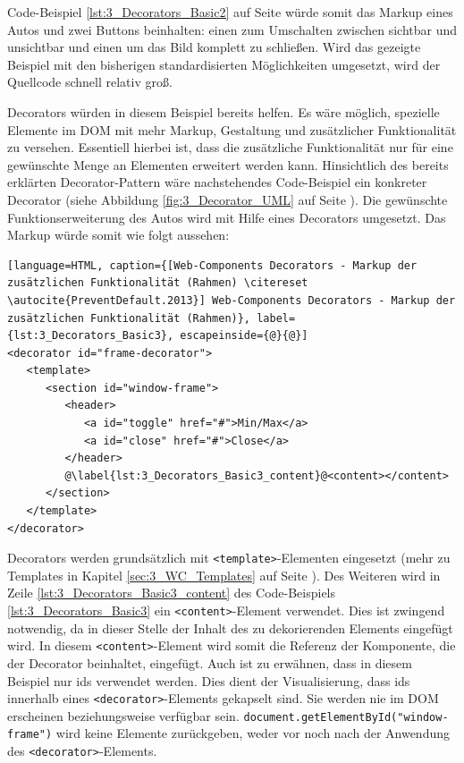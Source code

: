 Code-Beispiel \ref{lst:3_Decorators_Basic2} auf Seite \pageref{lst:3_Decorators_Basic2} würde somit das Markup eines Autos und zwei Buttons beinhalten: einen zum Umschalten zwischen sichtbar und unsichtbar und einen um das Bild komplett zu schließen.
Wird das gezeigte Beispiel mit den bisherigen standardisierten Möglichkeiten umgesetzt, wird der Quellcode schnell relativ groß.

Decorators würden in diesem Beispiel bereits helfen. Es wäre möglich, spezielle Elemente im DOM mit mehr Markup, Gestaltung und zusätzlicher Funktionalität zu versehen. Essentiell hierbei ist, dass die zusätzliche Funktionalität nur für eine gewünschte Menge an Elementen erweitert werden kann. Hinsichtlich des bereits erklärten Decorator-Pattern wäre nachstehendes Code-Beispiel ein konkreter Decorator (siehe Abbildung \ref{fig:3_Decorator_UML} auf Seite \pageref{fig:3_Decorator_UML}). Die gewünschte Funktionserweiterung des Autos wird mit Hilfe eines Decorators umgesetzt. Das Markup würde somit wie folgt aussehen:

\begin{lstlisting}[language=HTML, caption={[Web-Components Decorators - Markup der zusätzlichen Funktionalität (Rahmen) \citereset \autocite{PreventDefault.2013}] Web-Components Decorators - Markup der zusätzlichen Funktionalität (Rahmen)}, label={lst:3_Decorators_Basic3}, escapeinside={@}{@}]
<decorator id="frame-decorator">
   <template>
      <section id="window-frame">
         <header>
            <a id="toggle" href="#">Min/Max</a>
            <a id="close" href="#">Close</a>
         </header>
         @\label{lst:3_Decorators_Basic3_content}@<content></content>
      </section>
   </template>
</decorator>
\end{lstlisting}

Decorators werden grundsätzlich mit \lstinline|<template>|-Elementen eingesetzt (mehr zu Templates in Kapitel \ref{sec:3_WC_Templates} auf Seite \pageref{sec:3_WC_Templates}). Des Weiteren wird in Zeile \ref{lst:3_Decorators_Basic3_content} des Code-Beispiels \ref{lst:3_Decorators_Basic3} ein \lstinline|<content>|-Element verwendet. Dies ist zwingend notwendig, da in dieser Stelle der Inhalt des zu dekorierenden Elements eingefügt wird. In diesem \lstinline|<content>|-Element wird somit die Referenz der Komponente, die der Decorator beinhaltet, eingefügt.
Auch ist zu erwähnen, dass in diesem Beispiel nur ids verwendet werden. Dies dient der Visualisierung, dass ids innerhalb eines \lstinline|<decorator>|-Elements gekapselt sind. Sie werden nie im DOM erscheinen beziehungsweise verfügbar sein. \lstinline|document.getElementById("window-frame")| wird keine Elemente zurückgeben, weder vor noch nach der Anwendung des \lstinline|<decorator>|-Elements.

